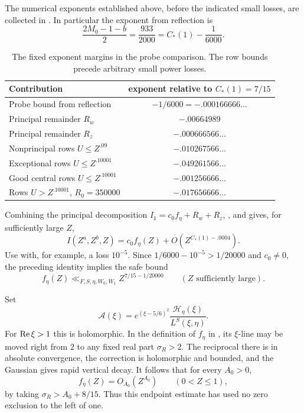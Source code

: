 The numerical exponents established above, before the indicated small
losses, are collected in .  In particular
the exponent from reflection is
\[
 \frac{2M_0-1-b}{2}=\frac{933}{2000}
       =C_*(1)-\frac1{6000}.
\]
\begin{table}[ht]
\centering
\begin{tabular}{@{}lc@{}}
\toprule
Contribution & exponent relative to \(C_*(1)=7/15\)\\
\midrule
Probe bound from reflection & \(-1/6000=-.000166666\ldots\)\\
Principal remainder \(R_w\) & \(-.00664989\)\\
Principal remainder \(R_z\) & \(-.000666566\ldots\)\\
Nonprincipal rows \(U\le Z^{.09}\) & \(-.010267566\ldots\)\\
Exceptional rows \(U\le Z^{.10001}\) & \(-.049261566\ldots\)\\
Good central rows \(U\le Z^{.10001}\) & \(-.001256666\ldots\)\\
Rows \(U>Z^{.10001}\), \(R_0=350000\) & \(-.017656666\ldots\)\\
\bottomrule
\end{tabular}
\caption{The fixed exponent margins in the probe comparison.  The row
bounds precede arbitrary small power losses.}
\label{tab:analytic-margins}
\end{table}

Combining the principal decomposition \(I_1=c_0f_\eta+R_w+R_z\),
, and
 gives, for sufficiently large \(Z\),
\[
 I(Z^a,Z^b,Z)=c_0f_\eta(Z)+O(Z^{C_*(1)-.0004}).
\]
Use  with, for example, a loss \(10^{-5}\).
Since \(1/6000-10^{-5}>1/20000\) and \(c_0\ne0\), the preceding identity
implies the safe bound
\begin{equation}
 f_\eta(Z)\ll_{F,S,\eta,W_0,W_1}Z^{7/15-1/20000}
       \qquad(Z\text{ sufficiently large}).
\label{eq:f-large-bound}
\end{equation}

Set
\[
 \mathscr A(\xi)=e^{(\xi-5/6)^2}
             \frac{\mathcal H_\eta(\xi)}{L^S(\xi,\eta)}.
\]
For \(\operatorname{Re}\xi>1\) this is holomorphic.  In the definition of \(f_\eta\) in
, its \(\xi\)-line may be moved right
from \(2\) to any fixed real part \(\sigma_R>2\).  The reciprocal there is in
absolute convergence, the correction is holomorphic and bounded, and
the Gaussian gives rapid vertical decay.  It follows that for every
\(A_0>0\),
\begin{equation}
 f_\eta(Z)=O_{A_0}(Z^{A_0})\qquad(0<Z\le1),
\label{eq:f-small-bound}
\end{equation}
by taking \(\sigma_R>A_0+8/15\).  Thus this endpoint estimate has used no
zero exclusion to the left of one.

